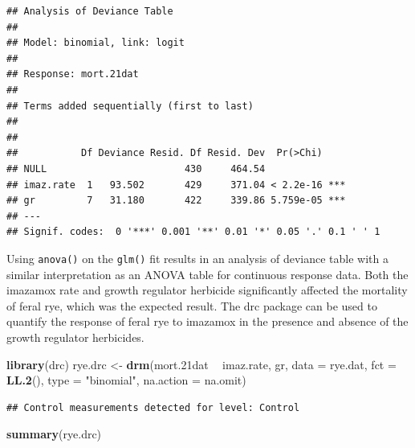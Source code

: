 \documentclass[letterpaper,]{book}
\newenvironment{Shaded}{\begin{snugshade}}{\end{snugshade}}
\newcommand{\DataTypeTok}[1]{\textcolor[rgb]{0.13,0.29,0.53}{#1}}
\newcommand{\FloatTok}[1]{\textcolor[rgb]{0.00,0.00,0.81}{#1}}
\newcommand{\KeywordTok}[1]{\textcolor[rgb]{0.13,0.29,0.53}{\textbf{#1}}}
\newcommand{\NormalTok}[1]{#1}
\newcommand{\OperatorTok}[1]{\textcolor[rgb]{0.81,0.36,0.00}{\textbf{#1}}}
\newcommand{\StringTok}[1]{\textcolor[rgb]{0.31,0.60,0.02}{#1}}
\begin{document}
\begin{verbatim}
## Analysis of Deviance Table
## 
## Model: binomial, link: logit
## 
## Response: mort.21dat
## 
## Terms added sequentially (first to last)
## 
## 
##           Df Deviance Resid. Df Resid. Dev  Pr(>Chi)    
## NULL                        430     464.54              
## imaz.rate  1   93.502       429     371.04 < 2.2e-16 ***
## gr         7   31.180       422     339.86 5.759e-05 ***
## ---
## Signif. codes:  0 '***' 0.001 '**' 0.01 '*' 0.05 '.' 0.1 ' ' 1
\end{verbatim}

Using \texttt{anova()} on the \texttt{glm()} fit results in an analysis of deviance table with a similar interpretation as an ANOVA table for continuous response data. Both the imazamox rate and growth regulator herbicide significantly affected the mortality of feral rye, which was the expected result. The drc package can be used to quantify the response of feral rye to imazamox in the presence and absence of the growth regulator herbicides.

\begin{Shaded}
\begin{Highlighting}[]
\KeywordTok{library}\NormalTok{(drc)}
\NormalTok{rye.drc <-}\StringTok{ }\KeywordTok{drm}\NormalTok{(mort}\FloatTok{.21}\NormalTok{dat }\OperatorTok{~}\StringTok{ }\NormalTok{imaz.rate, gr, }\DataTypeTok{data =}\NormalTok{ rye.dat, }\DataTypeTok{fct =} \KeywordTok{LL.2}\NormalTok{(), }
               \DataTypeTok{type =} \StringTok{"binomial"}\NormalTok{, }\DataTypeTok{na.action =}\NormalTok{ na.omit)}
\end{Highlighting}
\end{Shaded}

\begin{verbatim}
## Control measurements detected for level: Control
\end{verbatim}

\begin{Shaded}
\begin{Highlighting}[]
\KeywordTok{summary}\NormalTok{(rye.drc)}
\end{Highlighting}
\end{Shaded}
\end{document}
